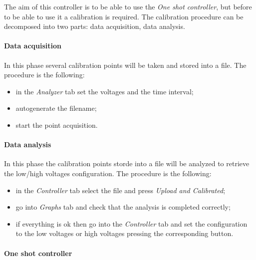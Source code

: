 

The aim of this controller is to be able to use the \emph{One shot
  controller}, but before to be able to use it a calibration is required. The calibration procedure can be decomposed into two parts:
data acquisition, data analysis.

\paragraph{Data acquisition}

In this phase several calibration points will be taken and stored into a file. The procedure
is the following:

\begin{itemize}
  \itemsep1pt\parskip0pt
  \item
        in the \emph{Analyzer} tab set the voltages and the time interval;
  \item
        autogenerate the filename;
  \item
        start the point acquisition.
\end{itemize}

\paragraph{Data analysis}

In this phase the calibration points storde into a
file will be analyzed to retrieve the low/high voltages configuration. The procedure is the following:

\begin{itemize}
  \itemsep1pt\parskip0pt
  \item
        in the \emph{Controller} tab select the file and press \emph{Upload
          and Calibrated};
  \item
        go into \emph{Graphs} tab and check that the analysis is completed
        correctly;
  \item
        if everything is ok then go into the \emph{Controller} tab and set the
        configuration to the low voltages or high voltages pressing the
        corresponding button.
\end{itemize}

\paragraph{One shot controller}

